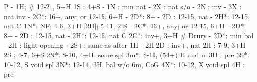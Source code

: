 P - 1H;  # 12-21, 5+H
1S : 4+S
   - 1N : min nat
        - 2X : nat s/o
        - 2N : inv
        - 3X : nat inv
   - 2C*: 16+, any; or 12-15, 6+H
        - 2D*: 8+
   - 2D : 12-15, nat
   - 2H*: 12-15, nat C
1N*: NF; 4-6, 3+H [2H]; 5-11, 2-S
   - 2C*: 16+, any; or 12-15, 6+H
        - 2D*: 8+
   - 2D : 12-15, nat
   - 2H*: 12-15, nat C
2C*: inv+, 3+H  # Drury
   - 2D*: min bal
   - 2H : light opening
   - 2S+: same as after 1H - 2H
2D : inv+, nat
2H : 7-9, 3+H
2S : 4-7, 6+S
2N*: 8-10, 4+H, some spl
3m*: 8-10, (54+) H and m
3H : pre
3S*: 10-12, S void spl
3N*: 12-14, 3H, bal w/o 6m, CoG
4X*: 10-12, X void spl
4H : pre